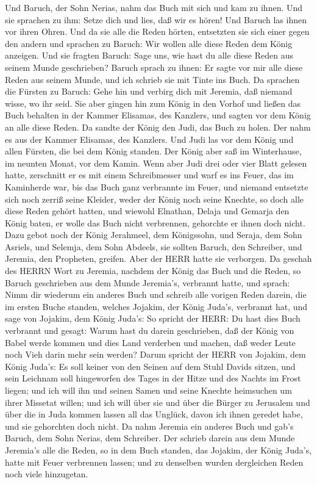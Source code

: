 Und Baruch, der Sohn Nerias, nahm das Buch mit sich und kam zu ihnen.
 Und sie sprachen zu ihm: Setze dich und lies, daß wir es
hören! Und Baruch las ihnen vor ihren Ohren.  Und da sie
alle die Reden hörten, entsetzten sie sich einer gegen den andern und
sprachen zu Baruch: Wir wollen alle diese Reden dem König anzeigen.
 Und sie fragten Baruch: Sage uns, wie hast du alle diese
Reden aus seinem Munde geschrieben?  Baruch sprach zu
ihnen: Er sagte vor mir alle diese Reden aus seinem Munde, und ich
schrieb sie mit Tinte ins Buch.  Da sprachen die Fürsten zu
Baruch: Gehe hin und verbirg dich mit Jeremia, daß niemand wisse, wo ihr
seid.  Sie aber gingen hin zum König in den Vorhof und
ließen das Buch behalten in der Kammer Elisamas, des Kanzlers, und
sagten vor dem König an alle diese Reden.  Da sandte der
König den Judi, das Buch zu holen. Der nahm es aus der Kammer Elisamas,
des Kanzlers. Und Judi las vor dem König und allen Fürsten, die bei dem
König standen.  Der König aber saß im Winterhause, im
neunten Monat, vor dem Kamin.  Wenn aber Judi drei oder
vier Blatt gelesen hatte, zerschnitt er es mit einem Schreibmesser und
warf es ins Feuer, das im Kaminherde war, bis das Buch ganz verbrannte
im Feuer,  und niemand entsetzte sich noch zerriß seine
Kleider, weder der König noch seine Knechte, so doch alle diese Reden
gehört hatten,  und wiewohl Elnathan, Delaja und Gemarja
den König baten, er wolle das Buch nicht verbrennen, gehorchte er ihnen
doch nicht.  Dazu gebot noch der König Jerahmeel, dem
Königssohn, und Seraja, dem Sohn Asriels, und Selemja, dem Sohn Abdeels,
sie sollten Baruch, den Schreiber, und Jeremia, den Propheten, greifen.
Aber der HERR hatte sie verborgen.  Da geschah des HERRN
Wort zu Jeremia, nachdem der König das Buch und die Reden, so Baruch
geschrieben aus dem Munde Jeremia's, verbrannt hatte, und sprach:
 Nimm dir wiederum ein anderes Buch und schreib alle
vorigen Reden darein, die im ersten Buche standen, welches Jojakim, der
König Juda's, verbrannt hat,  und sage von Jojakim, dem
König Juda's: So spricht der HERR: Du hast dies Buch verbrannt und
gesagt: Warum hast du darein geschrieben, daß der König von Babel werde
kommen und dies Land verderben und machen, daß weder Leute noch Vieh
darin mehr sein werden?  Darum spricht der HERR von
Jojakim, dem König Juda's: Es soll keiner von den Seinen auf dem Stuhl
Davids sitzen, und sein Leichnam soll hingeworfen des Tages in der Hitze
und des Nachts im Frost liegen;  und ich will ihn und
seinen Samen und seine Knechte heimsuchen um ihrer Missetat willen; und
ich will über sie und über die Bürger zu Jerusalem und über die in Juda
kommen lassen all das Unglück, davon ich ihnen geredet habe, und sie
gehorchten doch nicht.  Da nahm Jeremia ein anderes Buch
und gab's Baruch, dem Sohn Nerias, dem Schreiber. Der schrieb darein aus
dem Munde Jeremia's alle die Reden, so in dem Buch standen, das Jojakim,
der König Juda's, hatte mit Feuer verbrennen lassen; und zu denselben
wurden dergleichen Reden noch viele hinzugetan.

